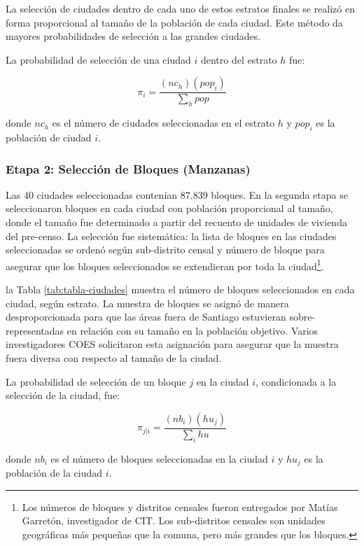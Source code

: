 \documentclass[
  12pt,
]{article}
\begin{document}
La selección de ciudades dentro de cada uno de estos estratos finales se realizó en forma proporcional al tamaño de la población de cada ciudad. Este método da mayores probabilidades de selección a las grandes ciudades.

La probabilidad de selección de una ciudad \(i\) dentro del estrato \(h\) fue:

\[\pi_i=\frac{(nc_h)(pop_i)}{\sum_h pop}\]

donde \(nc_h\) es el número de ciudades seleccionadas en el estrato \(h\) y \(pop_i\) es la población de ciudad \(i\).

\hypertarget{etapa2m1}{%
\subsubsection*{Etapa 2: Selección de Bloques (Manzanas)}\label{etapa2m1}}

Las 40 ciudades seleccionadas contenían 87.839 bloques. En la segunda etapa se seleccionaron bloques en cada ciudad con población proporcional al tamaño, donde el tamaño fue determinado a partir del recuento de unidades de vivienda del pre-censo. La selección fue sistemática: la lista de bloques en las ciudades seleccionadas se ordenó según sub-distrito censal y número de bloque para asegurar que los bloques seleccionados se extendieran por toda la ciudad\footnote{Los números de bloques y distritos censales fueron entregados por Matías Garretón, investigador de CIT. Los sub-distritos censales son unidades geográficas más pequeñas que la comuna, pero más grandes que los bloques.}.

la Tabla \ref{tab:tabla-ciudades} muestra el número de bloques seleccionados en cada ciudad, según estrato. La muestra de bloques se asignó de manera desproporcionada para que las áreas fuera de Santiago estuvieran sobre-representadas en relación con su tamaño en la población objetivo. Varios investigadores COES solicitaron esta asignación para asegurar que la muestra fuera diversa con respecto al tamaño de la ciudad.

La probabilidad de selección de un bloque \(j\) en la ciudad \(i\), condicionada a la selección de la ciudad, fue:

\[\pi_{j|i}=\frac{(nb_i)(hu_j)}{\sum_i hu}\]

donde \(nb_i\) es el número de bloques seleccionadas en la ciudad \(i\) y \(hu_j\) es la población de la ciudad \(i\).
\end{document}

